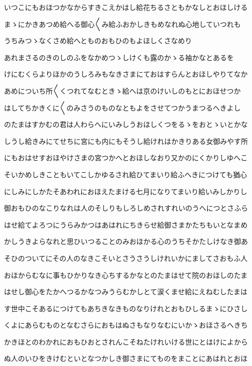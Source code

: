 \documentclass[a4paper,11pt,landscape]{ltjtarticle}
\begin{document}
いつこにもおほつかなからすきこえかはし給花ちるさともかなしとおほしける
\par\medskip
まゝにかきあつめ給へる御心〱み給ふおかしきもめなれぬ心地していつれも
\par\medskip
うちみつゝなくさめ給へとものおもひのもよほしくさなめり
\par\medskip
あれまさるのきのしのふをなかめつゝしけくも露のかゝる袖かなとあるを
\par\medskip
けにむくらよりほかのうしろみもなきさまにておはすらんとおほしやりてなか
\par\medskip
あめについち所〱くつれてなむときゝ給へは京のけいしのもとにおほせつか
\par\medskip
はしてちかきくに〱のみさうのものなともよをさせてつかうまつるへきよし
\par\medskip
のたまはすかむの君は人わらへにいみしうおほしくつをるゝをおとゝいとかな
\par\medskip
しうし給きみにてせちに宮にも内にもそうし給けれはかきりある女御みやす所
\par\medskip
にもおはせすおほやけさまの宮つかへとおほしなおり又かのにくかりしゆへこ
\par\medskip
そいかめしきこともいてこしかゆるされ給ひてまいり給ふへきにつけても猶心
\par\medskip
にしみにしかたそあわれにおほえたまける七月になりてまいり給いみしかりし
\par\medskip
御おもひのなこりなれは人のそしりもしろしめされすれいのうへにつとさふら
\par\medskip
はせ給てよろつにうらみかつはあはれにちきらせ給御さまかたちもいとなまめ
\par\medskip
かしうきよらなれと思ひいつることのみおほかる心のうちそかたしけなき御あ
\par\medskip
そひのついてにその人のなきこそいとさうさうしけれいかにましてさおもふ人
\par\medskip
おほからむなに事もひかりなき心ちするかなとのたまはせて院のおほしのたま
\par\medskip
はせし御心をたかへつるかなつみうらむかしとて涙くませ給にえねむしたまは
\par\medskip
す世中こそあるにつけてもあちきなきものなりけれとおもひしるまゝにひさし
\par\medskip
くよにあらむものとなむさらにおもはぬさもなりなむにいかゝおほさるへきち
\par\medskip
かきほとのわかれにおもひおとされんこそねたけれいける世にとはけによから
\par\medskip
ぬ人のいひをきけむといとなつかしき御さまにてものをまことにあはれとおほ
\end{document}
